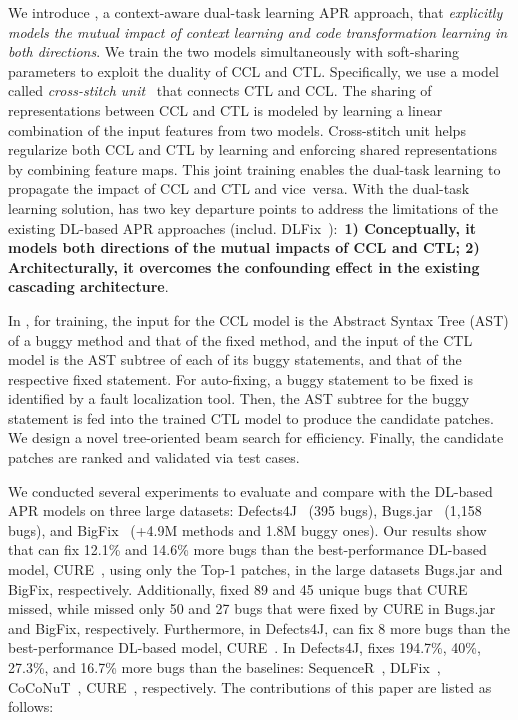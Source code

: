 
We introduce {\tool}, a context-aware dual-task learning APR approach,
that {\em explicitly models the mutual impact of context learning and
  code transformation learning in both directions}. We train the two
models simultaneously with soft-sharing parameters to exploit the
duality of CCL and CTL. Specifically, we use a model called {\em
  cross-stitch unit}~\cite{misra2016cross} that connects CTL and
CCL. The sharing of representations between CCL and CTL is modeled by
learning a linear combination of the input features from two
models. Cross-stitch unit helps regularize both CCL and CTL by
learning and enforcing shared representations by combining feature
maps. This joint training enables the dual-task learning to propagate
the impact of CCL and CTL and vice~versa. With the dual-task learning
solution, {\tool} has two key departure points to address the
limitations of the existing DL-based APR approaches
(includ. DLFix~\cite{icse20}):~{\bf 1) Conceptually, it models
  both directions of the mutual impacts of CCL and CTL; 2)
  Architecturally, it overcomes the confounding effect in the existing
  cascading architecture}.

In {\tool}, for training, the input for the CCL model is the Abstract
Syntax Tree (AST) of a buggy method and that of the fixed method, and
the input of the CTL model is the AST subtree of each of its buggy
statements, and that of the respective fixed statement. For
auto-fixing, a buggy statement to be fixed is identified by a fault
localization tool. Then, the AST subtree for the buggy statement is
fed into the trained CTL model to produce the candidate patches. We
design a novel tree-oriented beam search for efficiency. Finally, the
candidate patches are ranked and validated via test cases.

We conducted several experiments to evaluate and compare {\tool} with
the DL-based APR models on three large datasets:
Defects4J~\cite{defects4j} (395 bugs), Bugs.jar~\cite{saha2018bugs}
(1,158 bugs), and BigFix~\cite{yioopsla19} (+4.9M methods and 1.8M
buggy ones).
Our results show that {\tool} can fix 12.1\% and 14.6\% more bugs than
the best-performance DL-based model, CURE~\cite{cure-icse21}, using
only the Top-1 patches, in the large datasets Bugs.jar and BigFix,
respectively. Additionally, {\tool} fixed 89 and 45 unique bugs that
CURE missed, while {\tool} missed only 50 and 27 bugs that were fixed
by CURE in Bugs.jar and BigFix, respectively.  Furthermore, in
Defects4J, {\tool} can fix 8 more bugs than the best-performance
DL-based model, CURE~\cite{cure-icse21}. In Defects4J, {\tool} fixes
194.7\%, 40\%, 27.3\%, and 16.7\% more bugs than the baselines:
SequenceR~\cite{chen2018sequencer}, DLFix~\cite{icse20},
CoCoNuT~\cite{lutellier2020coconut}, CURE~\cite{cure-icse21},
respectively. The contributions of this paper are listed as follows:


